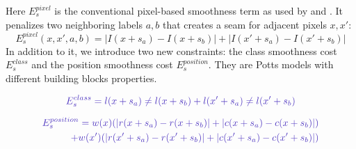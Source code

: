 \documentclass{acmtog}
\begin{document}
Here $E_{s}^{pixel}$ is the conventional pixel-based smoothness term as used by \cite{Pritch09ICCV} and \cite{He2012PO}. It penalizes two neighboring labels $a, b$ that creates a seam for adjacent pixels $x, x'$:
%
\begin{equation}
E_{s}^{pixel}(x, x', a, b) = |I(x + s_{a}) - I(x + s_{b})| + |I(x' + s_{a}) - I(x' + s_{b})|
\label{eq:EPixelSmooth}
\end{equation}
%
In addition to it, we introduce two new constraints: the class smoothness cost $E_{s}^{class}$ and the position smoothness cost $E_{s}^{position}$. They are Potts models with different building blocks properties. 


\begin{equation}
\revised{
E_{s}^{class} = l(x + s_{a}) \neq l(x + s_{b}) + l(x' + s_{a}) \neq l(x' + s_{b})}
\label{eq:class}
\end{equation}




\footnotesize
\begin{equation}
\begin{split}
\revised{E_{s}^{position} = w(x)(|r(x + s_{a}) - r(x + s_{b})| + |c(x + s_{a}) - c(x + s_{b})|)} \\
\revised{+ w(x')(|r(x' + s_{a}) - r(x' + s_{b})| + |c(x' + s_{a}) - c(x' + s_{b})|)}
\end{split}
\label{eq:position}
\end{equation}
\normalsize
\end{document}
